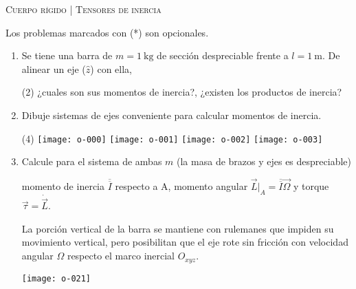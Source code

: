 \documentclass[11pt, spanish, a4paper, twopage]{article}
\begin{document}
\begin{center}
  \textsc{\large Cuerpo rígido | Tensores de inercia}
\end{center}

Los problemas marcados con (*) son opcionales.

\begin{enumerate}



\item Se tiene una barra de \(m= \SI{1}{\kilo\gram}\) de sección despreciable frente a \(l= \SI{1}{\metre}\).
De alinear un eje (\(\hat{z}\)) con ella, 
\begin{tasks}(2)
	\task	¿cuales son sus momentos de inercia?,
	\task ¿existen los productos de inercia? 
\end{tasks}


\item
Dibuje sistemas de ejes conveniente para calcular momentos de inercia.
\vspace{-1.1cm}
\begin{tasks}(4)
	\task \texttt{[image: o-000]}
	\task \texttt{[image: o-001]}
	\task \texttt{[image: o-002]}
	\task \texttt{[image: o-003]}
\end{tasks}



\item 
\begin{minipage}[t][4.5cm]{0.7\textwidth}
Calcule para el sistema de ambas $m$ (la masa de brazos y ejes es despreciable)
\begin{tasks} 
	\task momento de inercia \(\overline{\overline{I}}\) respecto a A,
	\task momento angular $\vec{L}\bigg\rvert_A = \overline{\overline{I}} \vec{\Omega}$ y torque $\vec{\tau} = \dot{\vec{L}}$.
\end{tasks}
La porción vertical de la barra se mantiene con rulemanes que impiden su movimiento vertical, pero posibilitan que el eje rote sin fricción con velocidad angular $\Omega$ respecto el marco inercial $O_{xyz}$.
\end{minipage}
\begin{minipage}[c][1cm][t]{0.25\textwidth}
	\texttt{[image: o-021]}
\end{minipage}




\end{enumerate}
\end{document}
